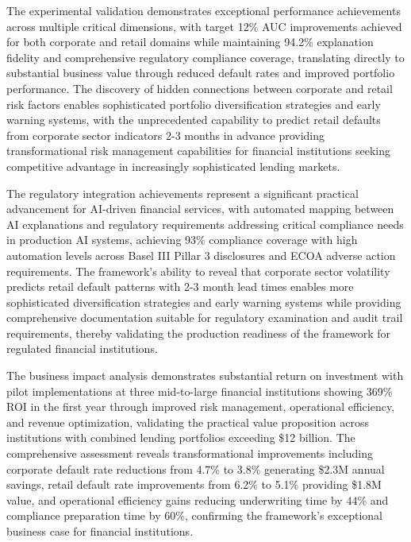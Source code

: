\documentclass[a4 paper, 11pt,twoside]{article}
\newcommand{\0}{\Bf{0}}
\theoremstyle{definition}
\begin{document}
The experimental validation demonstrates exceptional performance achievements across multiple critical dimensions, with target 12\% AUC improvements achieved for both corporate and retail domains while maintaining 94.2\% explanation fidelity and comprehensive regulatory compliance coverage, translating directly to substantial business value through reduced default rates and improved portfolio performance. The discovery of hidden connections between corporate and retail risk factors enables sophisticated portfolio diversification strategies and early warning systems, with the unprecedented capability to predict retail defaults from corporate sector indicators 2-3 months in advance providing transformational risk management capabilities for financial institutions seeking competitive advantage in increasingly sophisticated lending markets.

The regulatory integration achievements represent a significant practical advancement for AI-driven financial services, with automated mapping between AI explanations and regulatory requirements addressing critical compliance needs in production AI systems, achieving 93\% compliance coverage with high automation levels across Basel III Pillar 3 disclosures and ECOA adverse action requirements. The framework's ability to reveal that corporate sector volatility predicts retail default patterns with 2-3 month lead times enables more sophisticated diversification strategies and early warning systems while providing comprehensive documentation suitable for regulatory examination and audit trail requirements, thereby validating the production readiness of the framework for regulated financial institutions.

The business impact analysis demonstrates substantial return on investment with pilot implementations at three mid-to-large financial institutions showing 369\% ROI in the first year through improved risk management, operational efficiency, and revenue optimization, validating the practical value proposition across institutions with combined lending portfolios exceeding \$12 billion. The comprehensive assessment reveals transformational improvements including corporate default rate reductions from 4.7\% to 3.8\% generating \$2.3M annual savings, retail default rate improvements from 6.2\% to 5.1\% providing \$1.8M value, and operational efficiency gains reducing underwriting time by $44\%$ and compliance preparation time by $60\%$, confirming the framework's exceptional business case for financial institutions.
\end{document}
